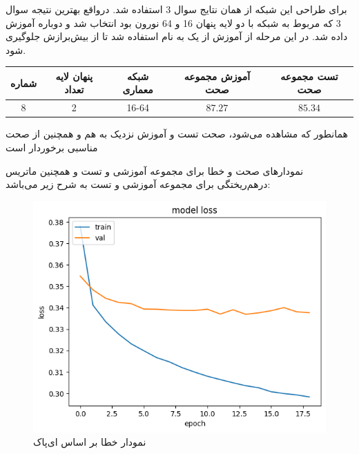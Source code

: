 \documentclass{article}
\begin{document}
برای طراحی این شبکه از همان نتایج سوال 3 استفاده شد. درواقع بهترین نتیجه سوال 3 که مربوط به شبکه با دو لایه پنهان 16 و 64 نورون بود انتخاب شد و دوباره آموزش داده شد. در این مرحله از آموزش از یک  به نام  استفاده شد تا از بیش‌برازش جلوگیری شود.


\begin{longtable}{|c|c|c|c|c|}
    \hline
    شماره             & پنهان لایه تعداد & شبکه معماری & آموزش مجموعه صحت & تست مجموعه صحت \\ \hline
    8 & 2 & 16-64  & $87.27$ & $85.34$ \\ \hline
\end{longtable}
همانطور که مشاهده می‌شود، صحت تست و آموزش نزدیک به هم و همچنین از صحت مناسبی برخوردار است

نمودارهای صحت و خطا برای مجموعه آموزشی و تست و همچنین ماتریس درهم‌ریختگی برای مجموعه آموزشی و تست به شرح زیر می‌باشد:
\cleardoublepage

\begin{figure}[!h]
    \centering\includegraphics[scale=.55]{./p7-1}
    \caption{نمودار خطا بر اساس ای‌پاک}\label{fig.71}
\end{figure}
\end{document}
